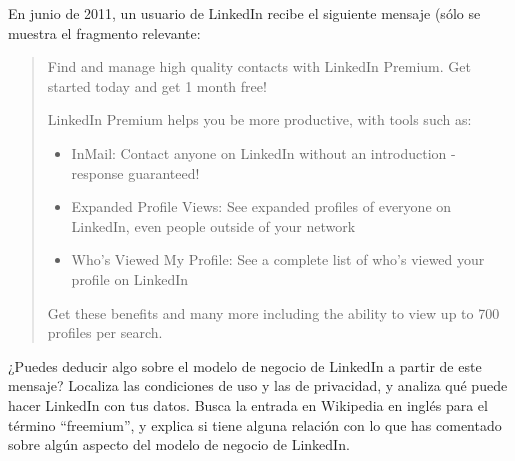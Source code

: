\documentclass[a4paper,12pt]{article}
\begin{document}
En junio de 2011, un usuario de LinkedIn recibe el siguiente mensaje (sólo se muestra el fragmento relevante:

\begin{quotation}
Find and manage high quality contacts with LinkedIn Premium. Get started today and get 1 month free!

LinkedIn Premium helps you be more productive, with tools such as:

\begin{itemize}
\item InMail: Contact anyone on LinkedIn without an introduction - response guaranteed!
\item Expanded Profile Views: See expanded profiles of everyone on LinkedIn, even people outside of your network
\item Who's Viewed My Profile: See a complete list of who's viewed your profile on LinkedIn
\end{itemize}

Get these benefits and many more including the ability to view up to 700 profiles per search.
\end{quotation}

¿Puedes deducir algo sobre el modelo de negocio de LinkedIn a partir de este mensaje? Localiza las condiciones de uso y las de privacidad, y analiza qué puede hacer LinkedIn con tus datos. Busca la entrada en Wikipedia en inglés para el término ``freemium'', y explica si tiene alguna relación con lo que has comentado sobre algún aspecto del modelo de negocio de LinkedIn.
\end{document}
